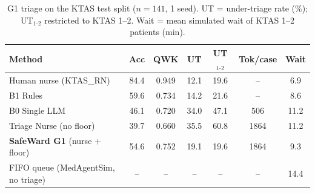 \begin{table}[t]\centering\small
\caption{G1 triage on the KTAS test split ($n=141$, 1 seed). UT = under-triage rate (\%); UT$_{1\text{-}2}$ restricted to KTAS 1--2. Wait = mean simulated wait of KTAS 1--2 patients (min).}
\label{tab:triage}
\setlength{\tabcolsep}{3pt}
\begin{tabular}{lcccccc}\toprule
Method & Acc & QWK & UT & UT$_{1\text{-}2}$ & Tok/case & Wait \\ \midrule
Human nurse (KTAS\_RN) & 84.4 & 0.949 & 12.1 & 19.6 & -- & 6.9 \\
B1 Rules & 59.6 & 0.734 & 14.2 & 21.6 & -- & 8.6 \\
B0 Single LLM & 46.1 & 0.720 & 34.0 & 47.1 & 506 & 11.2 \\
Triage Nurse (no floor) & 39.7 & 0.660 & 35.5 & 60.8 & 1864 & 11.2 \\
\textbf{SafeWard G1} (nurse + floor) & 54.6 & 0.752 & 19.1 & 19.6 & 1864 & 9.3 \\
\midrule
FIFO queue (MedAgentSim, no triage) & -- & -- & -- & -- & -- & 14.4 \\
\bottomrule\end{tabular}\end{table}
